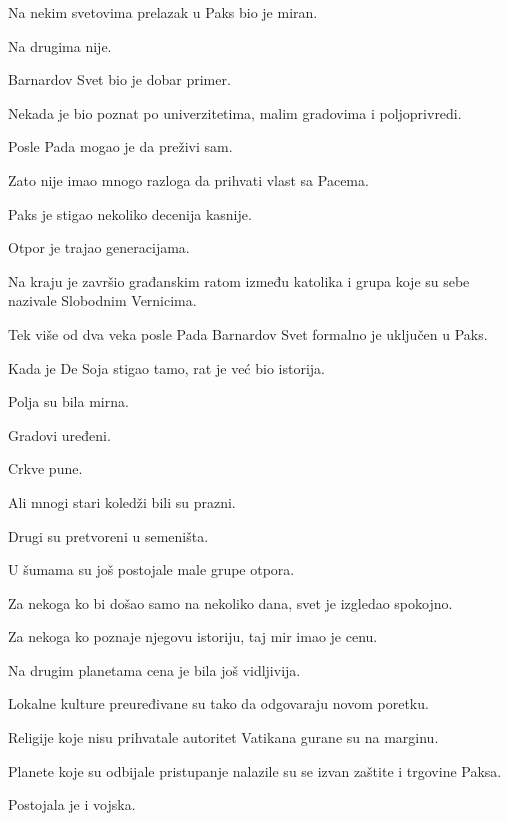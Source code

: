 \bigskip

Na nekim svetovima prelazak u Paks bio je miran.

Na drugima nije.

\bigskip

Barnardov Svet bio je dobar primer.

Nekada je bio poznat po univerzitetima, malim gradovima i poljoprivredi.

Posle Pada mogao je da preživi sam.

Zato nije imao mnogo razloga da prihvati vlast sa Pacema.

\bigskip

Paks je stigao nekoliko decenija kasnije.

Otpor je trajao generacijama.

Na kraju je završio građanskim ratom između katolika i grupa koje su sebe nazivale Slobodnim Vernicima.

Tek više od dva veka posle Pada Barnardov Svet formalno je uključen u Paks.

\bigskip

Kada je De Soja stigao tamo, rat je već bio istorija.

Polja su bila mirna.

Gradovi uređeni.

Crkve pune.

\bigskip

Ali mnogi stari koledži bili su prazni.

Drugi su pretvoreni u semeništa.

U šumama su još postojale male grupe otpora.

\bigskip

Za nekoga ko bi došao samo na nekoliko dana, svet je izgledao spokojno.

Za nekoga ko poznaje njegovu istoriju, taj mir imao je cenu.

\bigskip

Na drugim planetama cena je bila još vidljivija.

Lokalne kulture preuređivane su tako da odgovaraju novom poretku.

Religije koje nisu prihvatale autoritet Vatikana gurane su na marginu.

Planete koje su odbijale pristupanje nalazile su se izvan zaštite i trgovine Paksa.

\bigskip

Postojala je i vojska.

\bigskip

